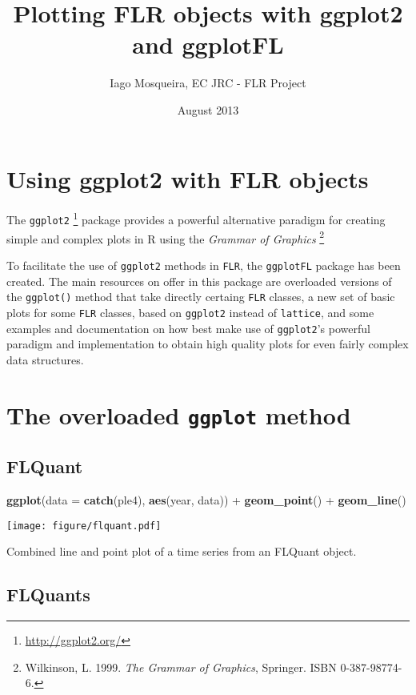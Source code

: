 \documentclass{tufte-handout}
\title{Plotting FLR objects with ggplot2 and ggplotFL}
\author{Iago Mosqueira, EC JRC - FLR Project}
\date{August 2013}
\newenvironment{Shaded}{}{}
\newcommand{\KeywordTok}[1]{\textcolor[rgb]{0.00,0.44,0.13}{\textbf{{#1}}}}
\newcommand{\DataTypeTok}[1]{\textcolor[rgb]{0.56,0.13,0.00}{{#1}}}
\newcommand{\NormalTok}[1]{{#1}}
\begin{document}
\maketitle

\section{Using ggplot2 with FLR objects}

The \texttt{ggplot2} \footnote{\url{http://ggplot2.org/}} package
provides a powerful alternative paradigm for creating simple and complex
plots in R using the \emph{Grammar of Graphics} \footnote{Wilkinson, L.
  1999. \emph{The Grammar of Graphics}, Springer. ISBN 0-387-98774-6.}

To facilitate the use of \texttt{ggplot2} methods in \texttt{FLR}, the
\texttt{ggplotFL} package has been created. The main resources on offer
in this package are overloaded versions of the \texttt{ggplot()} method
that take directly certaing \texttt{FLR} classes, a new set of basic
plots for some \texttt{FLR} classes, based on \texttt{ggplot2} instead
of \texttt{lattice}, and some examples and documentation on how best
make use of \texttt{ggplot2}'s powerful paradigm and implementation to
obtain high quality plots for even fairly complex data structures.

\section{The overloaded \texttt{ggplot} method}

\subsection{FLQuant}

\begin{Shaded}
\begin{Highlighting}[]
\KeywordTok{ggplot}\NormalTok{(}\DataTypeTok{data =} \KeywordTok{catch}\NormalTok{(ple4), }\KeywordTok{aes}\NormalTok{(year, data)) + }\KeywordTok{geom_point}\NormalTok{() + }
    \KeywordTok{geom_line}\NormalTok{()}
\end{Highlighting}
\end{Shaded}
\begin{marginfigure}
\centering
\texttt{[image: figure/flquant.pdf]}
\caption{Combined line and point plot of a time series from an FLQuant
object.}
\end{marginfigure}

\subsection{FLQuants}
\end{document}
